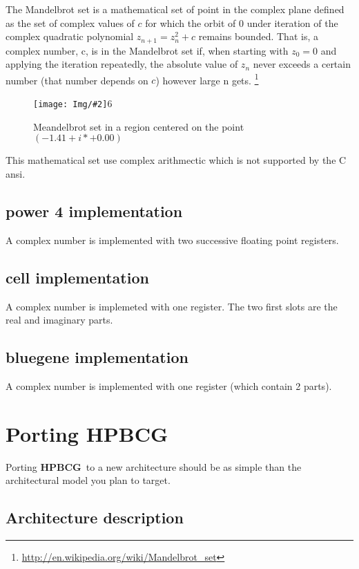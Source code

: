 \documentclass{article}
\newcommand{\hpbcg}{\textbf{HPBCG}\ }
\newcommand{\Image}[2][10]{\texttt{[image: Img/\#2]}}
\begin{document}
The Mandelbrot set is a mathematical set of point in the complex plane
defined as the set of complex values of $c$ for which the orbit of 0
under iteration of the complex quadratic polynomial $z_{n+1} = z_n^2 + c$
remains bounded. That is, a complex number, c, is in the Mandelbrot
set if, when starting with $z_0=0$ and applying the iteration repeatedly,
the absolute value of $z_n$ never exceeds a certain number (that number
depends on $c$) however large n
gets. \footnote{\url{http://en.wikipedia.org/wiki/Mandelbrot_set}}

\begin{figure}
  \centering \Image{Set-141-0.png}{6}
  \caption{Meandelbrot set in a region centered on the point $(-1.41+i*+0.00)$}
\end{figure}

This mathematical set use complex arithmectic which is not supported
by the C ansi.

\subsection{power 4 implementation}

A complex number is implemented with two successive floating point registers.

\subsection{cell implementation}

A complex number is implemeted with one register. The two first slots
are the real and imaginary parts.

\subsection{bluegene implementation}

A complex number is implemented with one register (which contain 2 parts).

\section{Porting \hpbcg}

Porting \hpbcg to a new architecture should be as simple than the
architectural model you plan to target.

\subsection{Architecture description}
\end{document}
